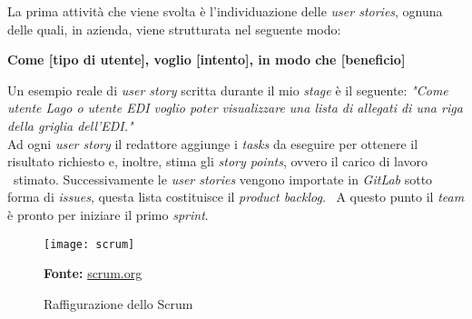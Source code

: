 La prima attività che viene svolta è l'individuazione delle \emph{user stories}, ognuna delle quali, in azienda, viene strutturata nel seguente modo:
\begin{center}
  \textbf{Come [tipo di utente], voglio [intento], in modo che [beneficio]}
\end{center}

Un esempio reale di \emph{user story} scritta durante il mio \emph{stage} è il seguente: 
\newline
\emph{"Come utente Lago o utente EDI voglio poter visualizzare una lista di allegati di una riga della griglia dell'EDI."} \\

Ad ogni \emph{user story} il redattore aggiunge i \emph{tasks} da eseguire per ottenere il risultato richiesto e, inoltre, stima gli \emph{story points}, ovvero il carico di lavoro \
stimato. Successivamente le \emph{user stories} vengono importate in \emph{GitLab} sotto forma di \emph{issues}, questa lista costituisce il \emph{product backlog}. \
A questo punto il \emph{team} è pronto per iniziare il primo \emph{sprint}. \\

\begin{figure}[!ht]
  \begin{center}
    \texttt{[image: scrum]}
    \caption{Raffigurazione dello Scrum}
    \textbf{Fonte:} \href{https://www.scrum.org}{scrum.org}
    \label{fig:scrum}
  \end{center}
\end{figure}

